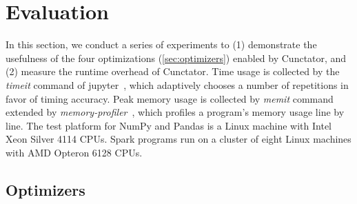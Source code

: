 \documentclass[sigconf]{acmart}\settopmatter{printfolios=true,printccs=false,printacmref=false}\setcopyright{none}
\begin{document}
\section{Evaluation}
\label{sec:eval}

In this section, we conduct a series of experiments to (1) demonstrate the usefulness of the four optimizations (\cref{sec:optimizers}) enabled by Cunctator, and (2) measure the runtime overhead of Cunctator. Time usage is collected by the \textit{timeit} command of jupyter~\cite{jupyter}, which adaptively chooses a number of repetitions in favor of timing accuracy. Peak memory usage is collected by \textit{memit} command extended by \textit{memory-profiler}~\cite{memoryprofiler}, which profiles a program's memory usage line by line. 
The test platform for NumPy and Pandas is a Linux machine with Intel Xeon Silver 4114 CPUs. Spark programs run on a cluster of eight Linux machines with AMD Opteron 6128 CPUs.

\subsection{Optimizers}
\end{document}
